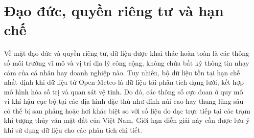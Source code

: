 \section{Đạo đức, quyền riêng tư và hạn chế}
Về mặt đạo đức và quyền riêng tư, dữ liệu được khai thác hoàn toàn là các thông số môi trường vĩ mô và vị trí địa lý công cộng, không chứa bất kỳ thông tin nhạy cảm của cá nhân hay doanh nghiệp nào. Tuy nhiên, bộ dữ liệu tồn tại hạn chế nhất định khi dữ liệu từ Open-Meteo là dữ liệu tái phân tích dạng lưới, kết hợp mô hình hóa số trị và quan sát vệ tinh. Do đó, các thông số cực đoan ở quy mô vi khí hậu cục bộ tại các địa hình đặc thù như đỉnh núi cao hay thung lũng sâu có thể bị san phẳng hoặc hơi khác biệt so với số liệu đo đạc trực tiếp tại các trạm khí tượng thủy văn mặt đất của Việt Nam. Giới hạn diễn giải này cần được lưu ý khi sử dụng dữ liệu cho các phân tích chi tiết.

